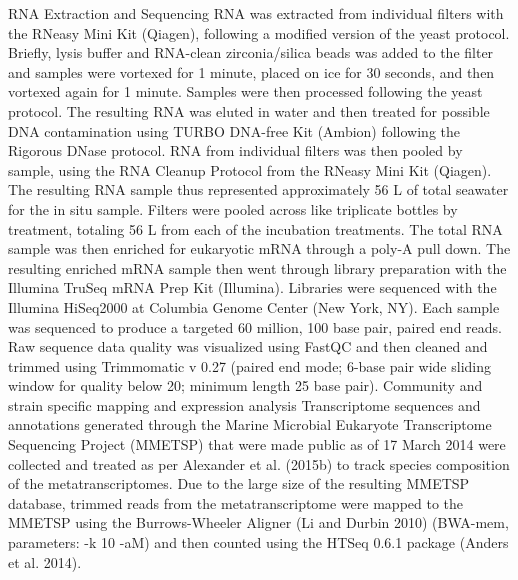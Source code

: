RNA Extraction and Sequencing
RNA was extracted from individual filters with the RNeasy Mini Kit (Qiagen), following a modified version of the yeast protocol. Briefly, lysis buffer and RNA-clean zirconia/silica beads was added to the filter and samples were vortexed for 1 minute, placed on ice for 30 seconds, and then vortexed again for 1 minute. Samples were then processed following the yeast protocol. The resulting RNA was eluted in water and then treated for possible DNA contamination using TURBO DNA-free Kit (Ambion) following the Rigorous DNase protocol. RNA from individual filters was then pooled by sample, using the RNA Cleanup Protocol from the RNeasy Mini Kit (Qiagen). The resulting RNA sample thus represented approximately 56 L of total seawater for the in situ sample. Filters were pooled across like triplicate bottles by treatment, totaling 56 L from each of the incubation treatments. The total RNA sample was then enriched for eukaryotic mRNA through a poly-A pull down. The resulting enriched mRNA sample then went through library preparation with the Illumina TruSeq mRNA Prep Kit (Illumina). Libraries were sequenced with the Illumina HiSeq2000 at Columbia Genome Center (New York, NY). Each sample was sequenced to produce a targeted 60 million, 100 base pair, paired end reads. Raw sequence data quality was visualized using FastQC and then cleaned and trimmed using Trimmomatic v 0.27 (paired end mode; 6-base pair wide sliding window for quality below 20; minimum length 25 base pair). 
Community and strain specific mapping and expression analysis
Transcriptome sequences and annotations generated through the Marine Microbial Eukaryote Transcriptome Sequencing Project (MMETSP) that were made public as of 17 March 2014 were collected and treated as per Alexander et al. (2015b) to track species composition of the metatranscriptomes. Due to the large size of the resulting MMETSP database, trimmed reads from the metatranscriptome were mapped to the MMETSP using the Burrows-Wheeler Aligner (Li and Durbin 2010) (BWA-mem, parameters: -k 10 -aM) and then counted using the HTSeq 0.6.1 package (Anders et al. 2014). 
